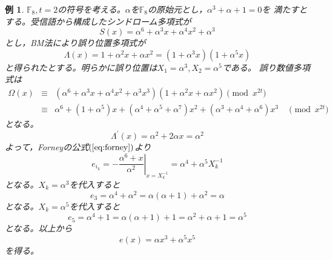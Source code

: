 \documentclass[12pt]{jarticle}
\theoremstyle{break}
\newtheorem{example}[theorem]{例}
\def\itOmega{\mathit{\Omega}}
\def\itLambda{\mathit{\Lambda}}
\def\bF{\mathbb{F}}
\def\itLambda{\mathit{\Lambda}}
\begin{document}
\begin{example}
$\bF_{8},t=2$の符号を考える。$\alpha$を$\bF_{8}$の原始元とし，$\alpha^{3}+\alpha+1=0$を
満たすとする。受信語から構成したシンドローム多項式が
\begin{equation}
S(x)=\alpha^{6}+\alpha^{3}x+\alpha^{4}x^{2}+\alpha^{3}\nonumber
\end{equation}
とし，{\rm BM}法により誤り位置多項式が
\begin{equation}
\itLambda(x)=1+\alpha^{2}x+\alpha x^{2}=(1+\alpha^{3}x)(1+\alpha^{5}x)
\nonumber
\end{equation}
と得られたとする。明らかに誤り位置は$X_{1}=\alpha^{3},X_{2}=\alpha^{5}$である。
誤り数値多項式は
\begin{eqnarray}
\itOmega(x)&\equiv&(\alpha^{6}+\alpha^{3}x+\alpha^{4}x^{2}+\alpha^{3}x^{3})
(1+\alpha^{2}x+\alpha
x^{2})\pmod{x^{2t}}\nonumber\\&\equiv&\alpha^{6}+(1+\alpha^{5})x
+(\alpha^{4}+\alpha^{5}+\alpha^{7})x^{2}+(\alpha^{3}+\alpha^{4}+\alpha^{6})x^{3}\quad\pmod{x^{2t}}
\nonumber
\end{eqnarray}
となる。
\begin{equation}
\itLambda^{\prime}(x)=\alpha^{2}+2\alpha x=\alpha^{2}\nonumber
\end{equation}
よって，{\rm Forney}の公式$(\ref{eq:forney})$より
\begin{equation}
e_{i_{k}}=-\left.\frac{\alpha^{6}+x}{\alpha^{2}}\right|_{x=X_{k}^{-1}}
=\alpha^{4}+\alpha^{5}X_{k}^{-1}\nonumber
\end{equation}
となる。$X_{k}=\alpha^{3}$を代入すると
\begin{equation}
e_{3}=\alpha^{4}+\alpha^{2}=\alpha(\alpha+1)+\alpha^{2}=\alpha\nonumber
\end{equation}
となる。$X_{k}=\alpha^{5}$を代入すると
\begin{equation}
e_{5}=\alpha^{4}+1=\alpha(\alpha+1)+1=\alpha^{2}+\alpha+1=\alpha^{5}
\nonumber
\end{equation}
となる。以上から
\begin{equation}
e(x)=\alpha x^{3}+\alpha^{5}x^{5}\nonumber
\end{equation}
を得る。
\end{example}
\end{document}
